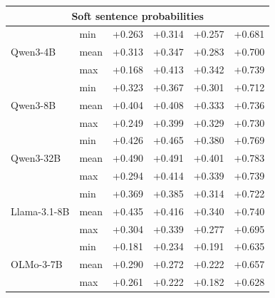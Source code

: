 \begin{longtable}{@{}llcccc@{}}
\multicolumn{6}{c}{\textbf{Soft sentence probabilities}} \\
\midrule

\multirow{3}{*}{Qwen3-4B}
  & min & +0.263 & +0.314 & +0.257 & +0.681 \\
  & mean & +0.313 & +0.347 & +0.283 & +0.700 \\
  & max & +0.168 & +0.413 & +0.342 & +0.739 \\
\cmidrule(l){2-6}
\multirow{3}{*}{Qwen3-8B}
  & min & +0.323 & +0.367 & +0.301 & +0.712 \\
  & mean & +0.404 & +0.408 & +0.333 & +0.736 \\
  & max & +0.249 & +0.399 & +0.329 & +0.730 \\
\cmidrule(l){2-6}
\multirow{3}{*}{Qwen3-32B}
  & min & +0.426 & +0.465 & +0.380 & +0.769 \\
  & mean & +0.490 & +0.491 & +0.401 & +0.783 \\
  & max & +0.294 & +0.414 & +0.339 & +0.739 \\
\cmidrule(l){2-6}
\multirow{3}{*}{Llama-3.1-8B}
  & min & +0.369 & +0.385 & +0.314 & +0.722 \\
  & mean & +0.435 & +0.416 & +0.340 & +0.740 \\
  & max & +0.304 & +0.339 & +0.277 & +0.695 \\
\cmidrule(l){2-6}
\multirow{3}{*}{OLMo-3-7B}
  & min & +0.181 & +0.234 & +0.191 & +0.635 \\
  & mean & +0.290 & +0.272 & +0.222 & +0.657 \\
  & max & +0.261 & +0.222 & +0.182 & +0.628 \\
\midrule

\end{longtable}
